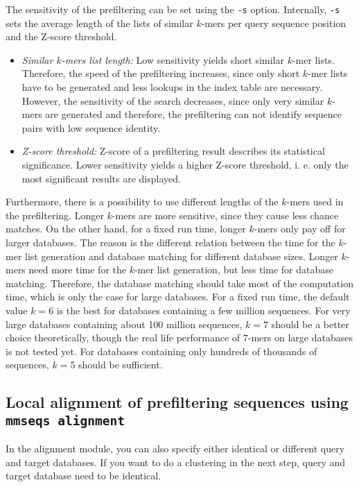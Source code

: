\documentclass[11pt,a4paper]{report}
\begin{document}
The sensitivity of the prefiltering can be set using the \texttt{-s}
option. Internally, \texttt{-s} sets the average length of the lists
of similar $k$-mers per query sequence position and the Z-score threshold. 
\begin{itemize}
\item \emph{Similar $k$-mers list length:} Low sensitivity yields short
similar $k$-mer lists. Therefore, the speed of the prefiltering increases,
since only short $k$-mer lists have to be generated and less lookups
in the index table are necessary. However, the sensitivity of the
search decreases, since only very similar $k$-mers are generated
and therefore, the prefiltering can not identify sequence pairs with
low sequence identity.
\item \emph{Z-score threshold:}\textbf{ }Z-score of a prefiltering result
describes its statistical significance. Lower sensitivity yields a
higher Z-score threshold, i. e. only the most significant results
are displayed.
\end{itemize}
Furthermore, there is a possibility to use different lengths of the
$k$-mers used in the prefiltering. Longer $k$-mers are more sensitive,
since they cause less chance matches. On the other hand, for a fixed
run time, longer $k$-mers only pay off for larger databases. The
reason is the different relation between the time for the $k$-mer
list generation and database matching for different database sizes.
Longer $k$-mers need more time for the $k$-mer list generation,
but less time for database matching. Therefore, the database matching
should take most of the computation time, which is only the case for
large databases. For a fixed run time, the default value $k=6$ is
the best for databases containing a few million sequences. For very
large databases containing about 100 million sequences, $k=7$ should
be a better choice theoretically, though the real life performance
of $7$-mers on large databases is not tested yet. For databases containing
only hundreds of thousands of sequences, $k=5$ should be sufficient. 


\subsection{Local alignment of prefiltering sequences using \texttt{mmseqs alignment}}

In the alignment module, you can also specify either identical or
different query and target databases. If you want to do a clustering
in the next step, query and target database need to be identical.
\end{document}
